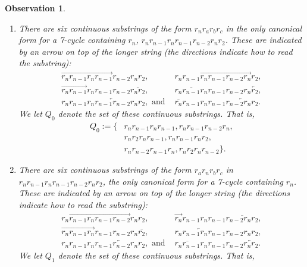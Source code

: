 \documentclass[final]{dmtcs-episciences}
\numberwithin{equation}{section}
\newtheorem{observation}[thm]{Observation}
\begin{document}
\begin{observation}\label{ob:S1} 

 \begin{enumerate}
 \item[(a)] There are six continuous substrings of the form $r_n r_a r_b r_c$ in the only canonical form for a 7-cycle containing $r_n$, $r_n r_{n-1} r_n r_{n-1} r_{n-2} r_n r_2$. These are indicated by an arrow on top of the longer string (the directions indicate how to read the substring): 
 \begin{align*}
 \overrightarrow{r_n r_{n-1} r_n r_{n-1}} r_{n-2} r_n r_2,\qquad& r_n r_{n-1} \overrightarrow{r_n r_{n-1} r_{n-2} r_n}r_2,\\ 
 \overrightarrow{r_n r_{n-1}} r_n r_{n-1} r_{n-2} \overline{r_n r_2},\qquad& \overline{r_n r_{n-1} r_n }r_{n-1} r_{n-2} r_n \overleftarrow{r_2},\\
 r_n r_{n-1} \overleftarrow{ r_n r_{n-1} r_{n-2} r_n} r_2,\text{ and  }& \overline{r_n} r_{n-1} r_n r_{n-1}  \overleftarrow{r_{n-2} r_n r_2}.
 \end{align*}
 We let $Q_0$ denote the set of these continuous substrings. That is,
 \begin{align*}
 Q_0 := \{
 &r_n r_{n-1} r_n r_{n-1},
 r_n r_{n-1} r_{n-2} r_n,\\ 
 &r_{n} r_2 r_n r_{n-1},
 r_n r_{n-1} r_n r_2, \\
 &r_n r_{n-2}r_{n-1} r_n,
 r_{n} r_2 r_n r_{n-2} 
 \}.    
 \end{align*}
 
 \item[(b)] There are six continuous substrings of the form $r_a r_n r_b r_c$ in $r_n r_{n-1} r_n r_{n-1} r_{n-2} r_n r_2$, the only canonical form for a 7-cycle containing $r_n$. These are indicated by an arrow on top of the longer string (the directions indicate how to read the substring): 
 \begin{align*}
 r_n \overrightarrow{r_{n-1} r_n r_{n-1} r_{n-2}} r_n r_2,\qquad& \overrightarrow{r_n} r_{n-1} r_n r_{n-1} \overline{r_{n-2} r_n r_2},\\ 
 \overrightarrow{r_n r_{n-1} r_n} r_{n-1} r_{n-2} r_n \overline{r_2},\qquad& \overleftarrow{r_n r_{n-1} r_n r_{n-1}} r_{n-2} r_n r_2,\\ 
 r_n r_{n-1} r_n \overleftarrow{r_{n-1} r_{n-2} r_n r_2},\text{ and  }& \overline{r_n r_{n-1}} r_n r_{n-1} r_{n-2} \overleftarrow{r_n r_2}.
 \end{align*}
 We let $Q_1$ denote the set of these continuous substrings. That is,
 

\end{enumerate}
\end{observation}
\end{document}
